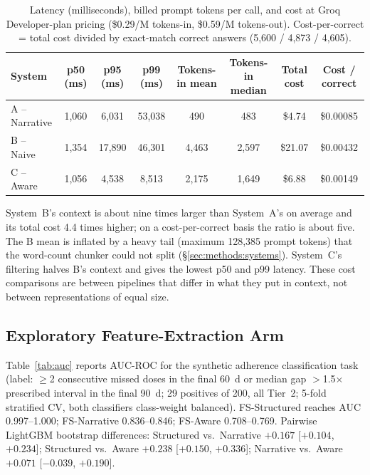 \begin{table}[htbp]
\centering
\small
\caption{Latency (milliseconds), billed prompt tokens per call, and cost at Groq
Developer-plan pricing (\$0.29/M tokens-in, \$0.59/M tokens-out).  Cost-per-correct =
total cost divided by exact-match correct answers (5{,}600 / 4{,}873 / 4{,}605).}
\label{tab:latency}
\begin{tabular}{lccccccc}
\toprule
System & p50 (ms) & p95 (ms) & p99 (ms) & Tokens-in mean & Tokens-in median & Total cost & Cost / correct \\
\midrule
A -- Narrative  & 1,060 & 6,031  & 53,038 &   490 &   483 & \$4.74  & \$0.00085 \\
B -- Naive      & 1,354 & 17,890 & 46,301 & 4,463 & 2,597 & \$21.07 & \$0.00432 \\
C -- Aware      & 1,056 & 4,538  &  8,513 & 2,175 & 1,649 & \$6.88  & \$0.00149 \\
\bottomrule
\end{tabular}
\end{table}

System~B's context is about nine times larger than System~A's on average and its total
cost 4.4 times higher; on a cost-per-correct basis the ratio is about five.  The B mean is
inflated by a heavy tail (maximum 128,385 prompt tokens) that the word-count chunker
could not split (\S\ref{sec:methods:systems}).  System~C's filtering halves B's context
and gives the lowest p50 and p99 latency.  These cost comparisons are between
pipelines that differ in what they put in context, not between representations of
equal size.

\subsection{Exploratory Feature-Extraction Arm}
\label{sec:results:o6}

Table~\ref{tab:auc} reports AUC-ROC for the synthetic adherence classification task
(label: $\geq$2 consecutive missed doses in the final 60~d or median gap
$>$1.5$\times$ prescribed interval in the final 90~d; 29 positives of 200, all Tier~2;
5-fold stratified CV, both classifiers class-weight balanced).  FS-Structured reaches
AUC 0.997--1.000; FS-Narrative 0.836--0.846; FS-Aware 0.708--0.769.  Pairwise LightGBM
bootstrap differences: Structured vs.\ Narrative $+0.167$ [$+0.104$, $+0.234$];
Structured vs.\ Aware $+0.238$ [$+0.150$, $+0.336$]; Narrative vs.\ Aware $+0.071$
[$-0.039$, $+0.190$].

